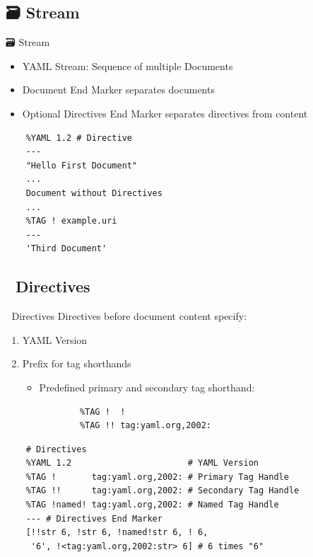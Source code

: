 \documentclass{beamer}
\newcommand{\code}[1]{
  \codebox{\texttt|#1|}
}
\begin{document}
\subsection{🗃 Stream}

\begin{frame}[fragile]{🗃 Stream}
  \begin{itemize}
    \item YAML Stream: Sequence of multiple Documents
    \item Document End Marker \code{...} separates documents
    \item Optional Directives End Marker \code{---} separates \alert{directives} from content
  \end{itemize}
  \begin{verbatim}
    %YAML 1.2 # Directive
    ---
    "Hello First Document"
    ...
    Document without Directives
    ...
    %TAG ! example.uri
    ---
    'Third Document'
  \end{verbatim}
\end{frame}

\subsection{📢 Directives}

\begin{frame}[fragile]{📢 Directives}
  Directives before document content specify:
  \begin{enumerate}
    \item YAML Version 
    \item Prefix for tag shorthands 
    \begin{itemize}
      \item Predefined primary and secondary tag shorthand:
      \begin{verbatim}
        %TAG !  !
        %TAG !! tag:yaml.org,2002:
      \end{verbatim}
    \end{itemize}
  \end{enumerate}
  \begin{verbatim}
    # Directives
    %YAML 1.2                       # YAML Version
    %TAG !       tag:yaml.org,2002: # Primary Tag Handle
    %TAG !!      tag:yaml.org,2002: # Secondary Tag Handle
    %TAG !named! tag:yaml.org,2002: # Named Tag Handle
    --- # Directives End Marker
    [!!str 6, !str 6, !named!str 6, ! 6,
     '6', !<tag:yaml.org,2002:str> 6] # 6 times "6"
  \end{verbatim}
\end{frame}
\end{document}
